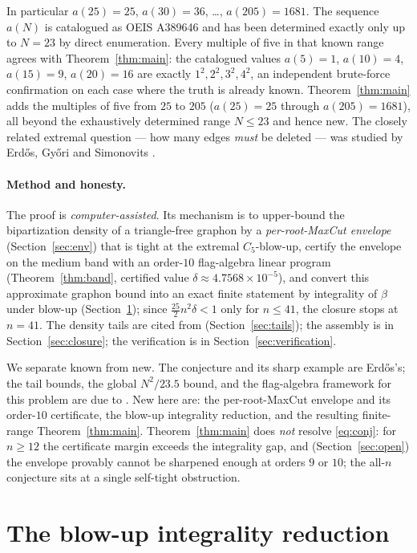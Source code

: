 \documentclass[11pt]{article}
\theoremstyle{remark}
\newcommand{\bip}{\beta}
\begin{document}
In particular $a(25)=25$, $a(30)=36$, \dots, $a(205)=1681$. The sequence $a(N)$ is
catalogued as OEIS A389646 \cite{A389646} and has been determined exactly only up
to $N=23$ by direct enumeration. Every multiple of five in that known range agrees
with Theorem~\ref{thm:main}: the catalogued values $a(5)=1$, $a(10)=4$, $a(15)=9$,
$a(20)=16$ are exactly $1^2,2^2,3^2,4^2$, an independent brute-force confirmation
on each case where the truth is already known. Theorem~\ref{thm:main} adds the
multiples of five from $25$ to $205$ ($a(25)=25$ through $a(205)=1681$), all beyond
the exhaustively determined range $N\le 23$ and hence new. The closely related
extremal question --- how many edges \emph{must} be deleted --- was studied by
Erd\H{o}s, Gy\H{o}ri and Simonovits \cite{EGS92}.

\paragraph{Method and honesty.} The proof is \emph{computer-assisted}. Its
mechanism is to upper-bound the bipartization density of a triangle-free graphon by
a \emph{per-root-MaxCut envelope} (Section~\ref{sec:env}) that is tight at the
extremal $C_5$-blow-up, certify the envelope on the medium band with an order-$10$
flag-algebra linear program (Theorem~\ref{thm:band}, certified value
$\delta\approx 4.7568\times10^{-5}$), and convert this approximate graphon bound into
an exact finite statement by integrality of $\bip$ under blow-up
(Section~\ref{sec:reduction}); since $\tfrac{25}{2}n^2\delta<1$ only for $n\le 41$,
the closure stops at $n=41$. The density tails are cited from \cite{BCL21}
(Section~\ref{sec:tails}); the assembly is in Section~\ref{sec:closure}; the
verification is in Section~\ref{sec:verification}.

We separate known from new. The conjecture and its sharp example are Erd\H{o}s's;
the tail bounds, the global $N^2/23.5$ bound, and the flag-algebra framework for
this problem are due to \cite{BCL21,Raz07}. New here are: the per-root-MaxCut
envelope and its order-$10$ certificate, the blow-up integrality reduction, and the
resulting finite-range Theorem~\ref{thm:main}. Theorem~\ref{thm:main} does
\emph{not} resolve \eqref{eq:conj}: for $n\ge 12$ the certificate margin exceeds
the integrality gap, and (Section~\ref{sec:open}) the envelope provably cannot be
sharpened enough at orders $9$ or $10$; the all-$n$ conjecture sits at a single
self-tight obstruction.

\section{The blow-up integrality reduction}\label{sec:reduction}
\end{document}
